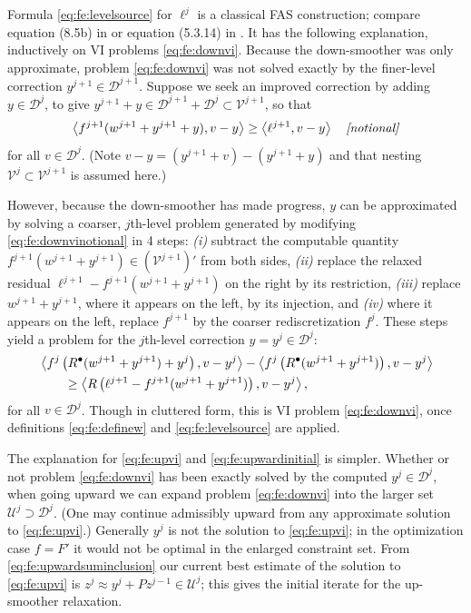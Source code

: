 \documentclass[review,hidelinks,onefignum,onetabnum]{siamart220329}
\newcommand{\cV}{\mathcal{V}}
\newcommand{\ip}[2]{\left<#1,#2\right>}
\newcommand{\iR}{R^{\bullet}}
\begin{document}
Formula \eqref{eq:fe:levelsource} for $\ell^j$ is a classical FAS construction; compare equation (8.5b) in \cite{BrandtLivne2011} or equation (5.3.14) in \cite{Trottenbergetal2001}.  It has the following explanation, inductively on VI problems \eqref{eq:fe:downvi}.  Because the down-smoother was only approximate, problem \eqref{eq:fe:downvi} was not solved exactly by the finer-level correction $y^{j+1} \in \mathcal{D}^{j+1}$.  Suppose we seek an improved correction by adding $y \in \mathcal{D}^{j}$, to give $y^{j+1}+y \in \mathcal{D}^{j+1}+\mathcal{D}^j \subset \cV^{j+1}$, so that
\begin{equation}
\ip{f^{j+1}(w^{j+1}+y^{j+1}+y)}{v-y} \ge \ip{\ell^{j+1}}{v-y} \quad \text{\emph{[notional]}} \label{eq:fe:downvinotional}
\end{equation}
for all $v \in \mathcal{D}^j$.  (Note $v-y = (y^{j+1}+v)-(y^{j+1}+y)$ and that nesting $\cV^j \subset \cV^{j+1}$ is assumed here.)

However, because the down-smoother has made progress, $y$ can be approximated by solving a coarser, $j$th-level problem generated by modifying \eqref{eq:fe:downvinotional} in 4 steps: \emph{(i)} subtract the computable quantity $f^{j+1}(w^{j+1}+y^{j+1}) \in (\mathcal{V}^{j+1})'$ from both sides, \emph{(ii)} replace the relaxed residual $\ell^{j+1}-f^{j+1}(w^{j+1}+y^{j+1})$ on the right by its restriction, \emph{(iii)} replace $w^{j+1}+y^{j+1}$, where it appears on the left, by its injection, and \emph{(iv)} where it appears on the left, replace $f^{j+1}$ by the coarser rediscretization $f^j$.  These steps yield a problem for the $j$th-level correction $y=y^j \in \mathcal{D}^j$:
\begin{align}
&\ip{f^j\left(\iR(w^{j+1}+y^{j+1})+y^j\right)}{v-y^j} - \ip{f^j\left(\iR(w^{j+1}+y^{j+1})\right)}{v-y^j} \label{eq:fe:downvicluttered} \\
&\qquad \ge \ip{R\left(\ell^{j+1}-f^{j+1}(w^{j+1}+y^{j+1})\right)}{v-y^j}, \notag
\end{align}
for all $v\in \mathcal{D}^{j}$.  Though in cluttered form, this is VI problem \eqref{eq:fe:downvi}, once definitions \eqref{eq:fe:definew} and \eqref{eq:fe:levelsource} are applied.

The explanation for \eqref{eq:fe:upvi} and \eqref{eq:fe:upwardinitial} is simpler.  Whether or not problem \eqref{eq:fe:downvi} has been exactly solved by the computed $y^j\in\mathcal{D}^j$, when going upward we can expand problem \eqref{eq:fe:downvi} into the larger set $\mathcal{U}^j \supset \mathcal{D}^j$.  (One may continue admissibly upward from any approximate solution to \eqref{eq:fe:upvi}.)  Generally $y^j$ is not the solution to \eqref{eq:fe:upvi}; in the optimization case $f=F'$ it would not be optimal in the enlarged constraint set.  From \eqref{eq:fe:upwardsuminclusion} our current best estimate of the solution to \eqref{eq:fe:upvi} is $z^j \approx y^j + Pz^{j-1}\in \mathcal{U}^j$; this gives the initial iterate for the up-smoother relaxation.
\end{document}
